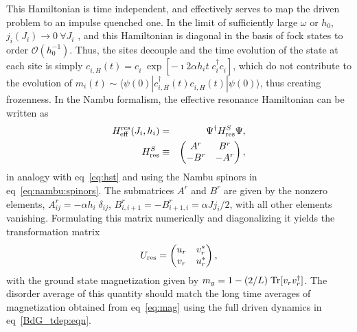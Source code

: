 \documentclass[a4paper,10pt]{article}
\begin{document}
This Hamiltonian is time independent, and effectively serves to map the driven problem to an impulse quenched one. In the limit of sufficiently large $\omega$ or $h_0$, $j_i(J_i) \rightarrow 0 \ \forall J_i$ , and this Hamiltonian is diagonal in the basis of fock states to order $\mathcal{O}(h^{-1}_0)$. Thus,  the sites decouple and the time evolution of the state at each site is simply $c^{\;}_{i,H}(t) = c^{\;}_i\;\exp{\left[-\imath 2\alpha  h_i t \; c^\dagger_i c^{\;}_i\right]}$, which do not contribute to the evolution of $m_i(t)\sim \langle \psi(0)|c^{\dagger}_{i,H}(t)c^{\;}_{i,H}(t)|\psi(0)\rangle$, thus creating frozenness. In the Nambu formalism, the effective resonance Hamiltonian can be written as
\begin{eqnarray}
\label{eq:heff:res:nambu}
H^{\rm res}_{\rm eff}(J_i,h_i)  &  =   & \Psi^\dagger H^{S}_{\rm res} \Psi,\nonumber \\
H^{S}_{\rm res} &\equiv& \begin{pmatrix}
                 A^r & B^r\\
                 -B^r & -A^r
                \end{pmatrix},
\end{eqnarray}
in analogy with eq~\ref{eq:hst} and using the Nambu spinors in eq~\ref{eq:nambu:spinors}. The submatrices $A^r$ and $B^r$ are
given by the nonzero elements, $A^r_{ij} = -\alpha h_i \; \delta_{ij}$, $B^r_{i,i+1}=-B^r_{i+1,i} = \alpha J j_i/2$, with all other elements vanishing. Formulating this matrix numerically and diagonalizing it yields the transformation matrix
\begin{equation}
U_{\rm res}        = \begin{pmatrix}         
		    u_r & v^{\ast}_r\\
		    v_r & u^{\ast}_r
		    \end{pmatrix},
\end{equation}
with the ground state magnetization given by $m_g = 1-(2/L)\;{\rm Tr}[v_rv^\dagger_r]$. The disorder average of this quantity should match the long time averages of magnetization obtained from eq~\ref{eq:mag} using the full driven dynamics in eq~\ref{BdG_tdep:eqn}.
\end{document}

